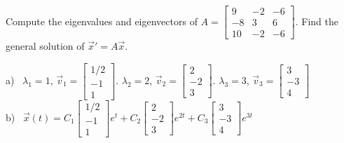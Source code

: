 \begin{exercise}
\leavevmode
\begin{tasks}
\task
Compute the eigenvalues and eigenvectors of
$A = \left[ \begin{smallmatrix}
9 & -2 & -6 \\
-8 & 3 & 6 \\
10 & -2 & -6
\end{smallmatrix} \right]$.
\task
Find the general solution of ${\vec{x}}' = A \vec{x}$.
\end{tasks}
\end{exercise}
\comboSol{%
}
{%
a)~ $\lambda_1 = 1$, $\vec{v}_1 = \left[\begin{smallmatrix} 1/2 \\ -1 \\ 1 \end{smallmatrix}\right]$. $\lambda_2 = 2$, $\vec{v}_2 = \left[\begin{smallmatrix} 2 \\ -2 \\ 3 \end{smallmatrix}\right]$. $\lambda_3 = 3$, $\vec{v}_3 = \left[\begin{smallmatrix} 3 \\ -3 \\ 4 \end{smallmatrix}\right]$ \\
b)~ $\vec{x}(t) = C_1\left[\begin{smallmatrix} 1/2 \\ -1 \\ 1 \end{smallmatrix}\right]e^t + C_2\left[\begin{smallmatrix} 2 \\ -2 \\ 3 \end{smallmatrix}\right]e^{2t} + C_3\left[\begin{smallmatrix} 3 \\ -3 \\ 4 \end{smallmatrix}\right]e^{3t}$
}

